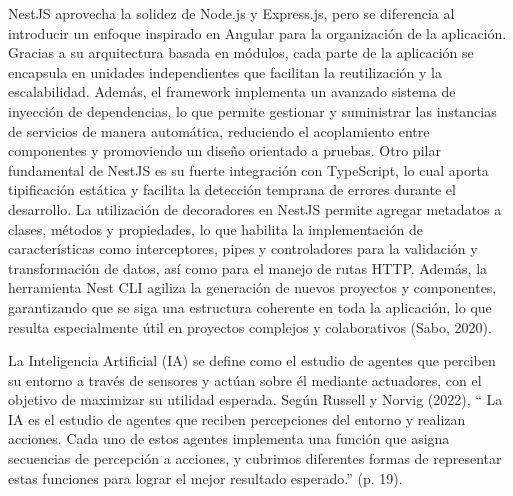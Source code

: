 NestJS aprovecha la solidez de Node.js y Express.js, pero se diferencia al introducir un enfoque inspirado en Angular para la organización de la aplicación. Gracias a su arquitectura basada en módulos, cada parte de la aplicación se encapsula en unidades independientes que facilitan la reutilización y la escalabilidad. Además, el framework implementa un avanzado sistema de inyección de dependencias, lo que permite gestionar y suministrar las instancias de servicios de manera automática, reduciendo el acoplamiento entre componentes y promoviendo un diseño orientado a pruebas. Otro pilar fundamental de NestJS es su fuerte integración con TypeScript, lo cual aporta tipificación estática y facilita la detección temprana de errores durante el desarrollo. La utilización de decoradores en NestJS permite agregar metadatos a clases, métodos y propiedades, lo que habilita la implementación de características como interceptores, pipes y controladores para la validación y transformación de datos, así como para el manejo de rutas HTTP. Además, la herramienta Nest CLI agiliza la generación de nuevos proyectos y componentes, garantizando que se siga una estructura coherente en toda la aplicación, lo que resulta especialmente útil en proyectos complejos y colaborativos (Sabo, 2020).


La Inteligencia Artificial (IA) se define como el estudio de agentes que perciben su entorno a través de sensores y actúan sobre él mediante actuadores, con el objetivo de maximizar su utilidad esperada. Según Russell y Norvig (2022), `` La IA es el estudio de agentes que reciben percepciones del entorno y realizan acciones. Cada uno de estos agentes implementa una función que asigna secuencias de percepción a acciones, y cubrimos diferentes formas de representar estas funciones para lograr el mejor resultado esperado.'' (p. 19).

